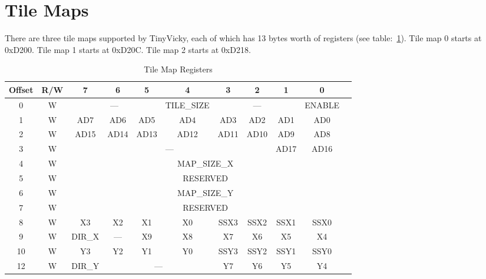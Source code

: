 \section{Tile Maps}

There are three tile maps supported by TinyVicky, each of which has 13 bytes worth of registers (see table:~\ref{tab:tilemap_reg}). Tile map 0 starts at 0xD200. Tile map 1 starts at 0xD20C. Tile map 2 starts at 0xD218.

\begin{table}[ht]
    \begin{center}
        \begin{tabular}{|c|c|c|c|c|c|c|c|c|c|c|} \hline
            Offset & R/W & 7 & 6 & 5 & 4 & 3 & 2 & 1 & 0 \\ \hline
            0 & W & \multicolumn{3}{|c|}{---} & TILE\_SIZE & \multicolumn{3}{|c|}{---} & ENABLE \\ \hline
            1 & W & AD7 & AD6 & AD5 & AD4 & AD3 & AD2 & AD1 & AD0 \\ \hline
            2 & W & AD15 & AD14 & AD13 & AD12 & AD11 & AD10 & AD9 & AD8 \\ \hline
            3 & W & \multicolumn{6}{|c|}{---} & AD17 & AD16 \\ \hline
            4 & W & \multicolumn{8}{|c|}{MAP\_SIZE\_X} \\ \hline
            5 & W & \multicolumn{8}{|c|}{RESERVED} \\ \hline
            6 & W & \multicolumn{8}{|c|}{MAP\_SIZE\_Y} \\ \hline
            7 & W & \multicolumn{8}{|c|}{RESERVED} \\ \hline
            8 & W & X3 & X2 & X1 & X0 & SSX3 & SSX2 & SSX1 & SSX0 \\ \hline
            9 & W & DIR\_X & --- & X9 & X8 & X7 & X6 & X5 & X4 \\ \hline
            10 & W & Y3 & Y2 & Y1 & Y0 & SSY3 & SSY2 & SSY1 & SSY0 \\ \hline
            12 & W & DIR\_Y &\multicolumn{3}{|c|}{---} & Y7 & Y6 & Y5 & Y4 \\ \hline
        \end{tabular}
    \end{center}
    \caption{Tile Map Registers}
    \label{tab:tilemap_reg}
\end{table}

